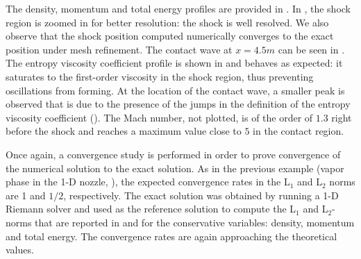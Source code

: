 %
The density, momentum and total energy profiles are provided in . In , the shock region is zoomed in for better resolution: the shock is well resolved. We also observe that the shock position computed numerically converges to the exact position under mesh refinement. The contact wave at $x=4.5m$ can be seen in . The entropy viscosity coefficient profile is shown in  and behaves as expected: it saturates to the first-order viscosity in the shock region, thus preventing oscillations from forming. At the location of the contact wave, a smaller peak is observed that is due to the presence of the jumps in the definition of the entropy viscosity coefficient ().  The Mach number, not plotted, is of the order of $1.3$ right before the shock and reaches a maximum value close to $5$ in the contact region.

Once again, a convergence study is performed in order to prove convergence of the numerical solution to the exact solution. As in the previous example (vapor phase in the 1-D nozzle, ), the expected convergence rates in the L$_1$ and L$_2$ norms are 1 and $1/2$, respectively. The exact solution was obtained by running a 1-D Riemann solver and used as the reference solution to compute the L$_1$ and L$_2$-norms that are reported in  and  for the conservative variables: density, momentum and total energy. The convergence rates are again approaching the theoretical values.


